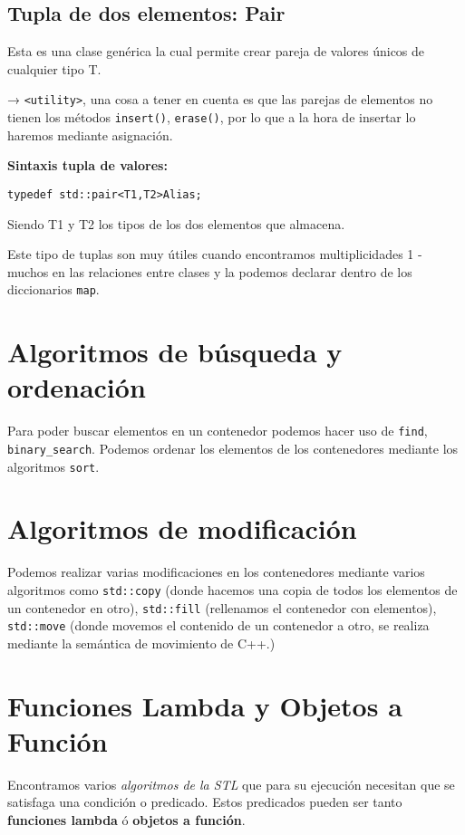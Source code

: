 \subsection{Tupla de dos elementos: Pair}
Esta es una clase genérica la cual permite crear pareja de valores únicos de cualquier tipo T.

 →  \texttt{<utility>}, una cosa a tener en cuenta es que las parejas de elementos
no tienen los métodos \texttt{insert()}, \texttt{erase()}, por lo que a la hora de insertar lo haremos mediante asignación.

\textbf{\large{Sintaxis tupla de valores:}}
\begin{center}
  \begin{lstlisting}[frame=single]
                typedef std::pair<T1,T2>Alias;
  \end{lstlisting}
  \end{center}
Siendo T1 y T2 los tipos de los dos elementos que almacena.

Este tipo de tuplas son muy útiles cuando encontramos multiplicidades 1 - muchos en las relaciones entre clases y la
podemos declarar dentro de los diccionarios \texttt{map}.

\section{Algoritmos de búsqueda y ordenación}
Para poder buscar elementos en un contenedor podemos hacer uso de \texttt{find}, \texttt{binary\_search}.
Podemos ordenar los elementos de los contenedores mediante los algoritmos \texttt{sort}.
\section{Algoritmos de modificación}
Podemos realizar varias modificaciones en los contenedores mediante varios algoritmos como \texttt{std::copy} (donde hacemos una copia de todos los elementos de un contenedor en otro),
\texttt{std::fill} (rellenamos el contenedor con elementos), \texttt{std::move} (donde movemos el contenido de un contenedor a otro, se realiza mediante la semántica de movimiento de C++.)

\section{Funciones Lambda y Objetos a Función}

Encontramos varios \textit{algoritmos de la STL} que para su ejecución necesitan que se satisfaga una condición o predicado.
Estos predicados pueden ser tanto \textbf{funciones lambda} ó \textbf{objetos a función}.

